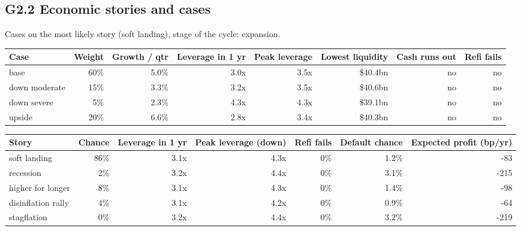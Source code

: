 \documentclass[11pt,a4paper]{article}
\begin{document}
\subsection*{G2.2 Economic stories and cases}
Cases on the most likely story (soft landing), stage of the cycle: expansion.
\begin{center}\scriptsize\setlength{\tabcolsep}{3.5pt}\begin{tabular}{@{}lrrrrrrr@{}}\toprule
Case & Weight & Growth / qtr & Leverage in 1 yr & Peak leverage & Lowest liquidity & Cash runs out & Refi fails \\\midrule
base & 60\% & 5.0\% & 3.0x & 3.5x & \$40.4bn & no & no \\
down moderate & 15\% & 3.3\% & 3.2x & 3.5x & \$40.6bn & no & no \\
down severe & 5\% & 2.3\% & 4.3x & 4.3x & \$39.1bn & no & no \\
upside & 20\% & 6.6\% & 2.8x & 3.4x & \$40.3bn & no & no \\
\bottomrule\end{tabular}\end{center}
\begin{center}\scriptsize\setlength{\tabcolsep}{3.5pt}\begin{tabular}{@{}lrrrrrr@{}}\toprule
Story & Chance & Leverage in 1 yr & Peak leverage (down) & Refi fails & Default chance & Expected profit (bp/yr) \\\midrule
soft landing & 86\% & 3.1x & 4.3x & 0\% & 1.2\% & -83 \\
recession & 2\% & 3.2x & 4.4x & 0\% & 3.1\% & -215 \\
higher for longer & 8\% & 3.1x & 4.3x & 0\% & 1.4\% & -98 \\
disinflation rally & 4\% & 3.1x & 4.2x & 0\% & 0.9\% & -64 \\
stagflation & 0\% & 3.2x & 4.4x & 0\% & 3.2\% & -219 \\
\bottomrule\end{tabular}\end{center}
\end{document}
